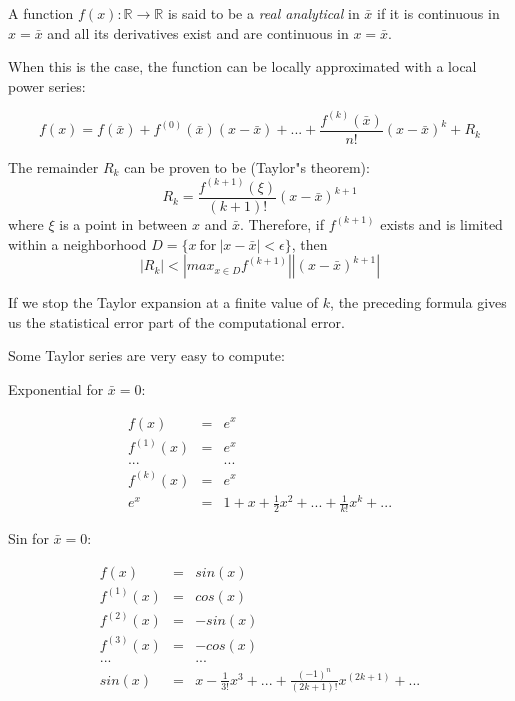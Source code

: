 \documentclass[justified, sixbynine]{tufte-book}
\theoremstyle{plain}%
\newtheorem * {corollary}{Corollary}
\theoremstyle{definition}
\theoremstyle{remark}
\newtheorem * {remark}{Remark}
\newtheorem * {note}{Note}
\begin{document}
\begin{fullwidth}

A function $f(x):\mathbb{R}\rightarrow\mathbb{R}$ is said to be a {\it real analytical} in $\bar x$ if it is continuous in $x=\bar x$ and all its derivatives exist and are continuous in $x=\bar x$.

When this is the case, the function can be locally approximated with a local power series:

\begin{equation}
f(x) = f(\bar x) + f^{(0)}(\bar x)(x-\bar x) + ... + \frac{f^{(k)}(\bar x)}{n!}(x-\bar x)^k + R_k
\end{equation}

The remainder $R_k$ can be proven to be (Taylor"s theorem):
\begin{equation}
R_k = \frac{f^{(k+1)}(\xi)}{(k+1)!}(x-\bar x)^{k+1}
\end{equation}
where $\xi$ is a point in between $x$ and $\bar x$. Therefore, if $f^{(k+1)}$ exists and is limited within a neighborhood $D = \{x~\textrm{for}~|x-\bar x|<\epsilon\}$, then
\begin{equation}
|R_k| < \left| max_{x\in D} f^{(k+1)} \right| |(x-\bar x)^{k+1}|
\end{equation}

If we stop the Taylor expansion at a finite value of $k$, the preceding formula gives us the statistical error part of the computational error.

Some Taylor series are very easy to compute:

Exponential for $\bar x = 0$:

\begin{eqnarray}
f(x) &=& e^x \\
f^{(1)}(x) &=& e^x \\
... && ... \\
f^{(k)}(x) &=& e^x \\
e^x &=&  1 + x + \frac12 x^2 + ... + \frac1{k!}x^k + ...
\end{eqnarray}

Sin for $\bar x = 0$:

\begin{eqnarray}
f(x) &=& sin(x) \\
f^{(1)}(x) &=& cos(x) \\
f^{(2)}(x) &=& -sin(x) \\
f^{(3)}(x) &=& -cos(x) \\
... && ... \\
sin(x) &=&  x - \frac1{3!}x^3 + ... + \frac{(-1)^n}{(2k+1)!}x^{(2k+1)} + ...
\end{eqnarray}


\end{fullwidth}
\end{document}
